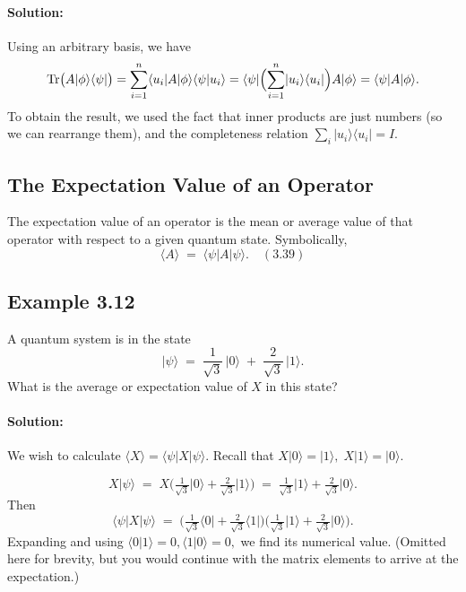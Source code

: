 \documentclass{article}
\begin{document}
\paragraph{Solution:}
Using an arbitrary basis, we have
\[
\mathrm{Tr}\bigl(A \lvert\phi\rangle\langle\psi\rvert \bigr)
= \sum_{i=1}^{n} \langle u_i \lvert A \lvert \phi\rangle \langle\psi \lvert u_i\rangle
= \langle \psi \lvert \Bigl(\sum_{i=1}^{n} \lvert u_i\rangle \langle u_i\rvert\Bigr) A \lvert\phi\rangle
= \langle\psi \lvert A \lvert\phi\rangle.
\]
To obtain the result, we used the fact that inner products are just numbers (so we can rearrange them), and the completeness relation \(\sum_i |u_i\rangle \langle u_i| = I\).

\subsection*{The Expectation Value of an Operator}
The expectation value of an operator is the mean or average value of that operator with respect to a given quantum state. Symbolically,
\[
\langle A \rangle \;=\; \langle \psi \lvert A \lvert \psi \rangle. \quad (3.39)
\]

\subsection*{Example 3.12}
A quantum system is in the state
\[
\lvert\psi\rangle \;=\; \frac{1}{\sqrt{3}}\,\lvert 0\rangle \;+\; \frac{2}{\sqrt{3}}\,\lvert 1\rangle.
\]
What is the average or expectation value of \(X\) in this state?

\paragraph{Solution:}
We wish to calculate \(\langle X \rangle = \langle \psi \lvert X \lvert \psi \rangle.\)
Recall that \(X \lvert 0\rangle = \lvert 1\rangle,\; X \lvert 1\rangle = \lvert 0\rangle.\)

\[
X \lvert \psi\rangle \;=\; X \biggl(\tfrac{1}{\sqrt{3}}\lvert 0\rangle + \tfrac{2}{\sqrt{3}}\lvert 1\rangle\biggr)
\;=\; \tfrac{1}{\sqrt{3}}\lvert 1\rangle + \tfrac{2}{\sqrt{3}}\lvert 0\rangle.
\]
Then
\[
\langle \psi \lvert X \lvert \psi\rangle 
\;=\; \bigl(\tfrac{1}{\sqrt{3}}\langle 0\rvert + \tfrac{2}{\sqrt{3}}\langle 1\rvert\bigr)
\bigl(\tfrac{1}{\sqrt{3}}\lvert 1\rangle + \tfrac{2}{\sqrt{3}}\lvert 0\rangle\bigr).
\]
Expanding and using \(\langle 0\vert 1\rangle=0, \langle 1\vert 0\rangle=0,\) we find its numerical value. (Omitted here for brevity, but you would continue with the matrix elements to arrive at the expectation.)
\end{document}
